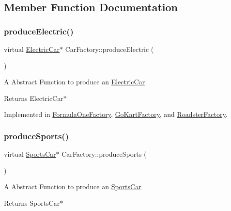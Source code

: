\subsection{Member Function Documentation}
\mbox{\label{class_car_factory_a2a9be1558ef604f44ea3588bcc06b3db}} 
\subsubsection{\texorpdfstring{produce\+Electric()}{produceElectric()}}
{\footnotesize\ttfamily virtual \mbox{\hyperlink{class_electric_car}{Electric\+Car}}$\ast$ Car\+Factory\+::produce\+Electric (\begin{DoxyParamCaption}{ }\end{DoxyParamCaption})\hspace{0.3cm}{\ttfamily [pure virtual]}}

A Abstract Function to produce an \mbox{\hyperlink{class_electric_car}{Electric\+Car}} \begin{DoxyReturn}{Returns}
Electric\+Car$\ast$ 
\end{DoxyReturn}


Implemented in \mbox{\hyperlink{class_formula_one_factory_a84f67420468555a786c8103e21deeaf8}{Formula\+One\+Factory}}, \mbox{\hyperlink{class_go_kart_factory_a936c39773bebc3bdd372d3a40f7ffd70}{Go\+Kart\+Factory}}, and \mbox{\hyperlink{class_roadster_factory_abb3e30ce51a09d04e72af473f2899774}{Roadster\+Factory}}.

\mbox{\label{class_car_factory_a6ea0703f2e692c09dea7a3602836410f}} 
\subsubsection{\texorpdfstring{produce\+Sports()}{produceSports()}}
{\footnotesize\ttfamily virtual \mbox{\hyperlink{class_sports_car}{Sports\+Car}}$\ast$ Car\+Factory\+::produce\+Sports (\begin{DoxyParamCaption}{ }\end{DoxyParamCaption})\hspace{0.3cm}{\ttfamily [pure virtual]}}

A Abstract Function to produce an \mbox{\hyperlink{class_sports_car}{Sports\+Car}} \begin{DoxyReturn}{Returns}
Sports\+Car$\ast$ 
\end{DoxyReturn}


